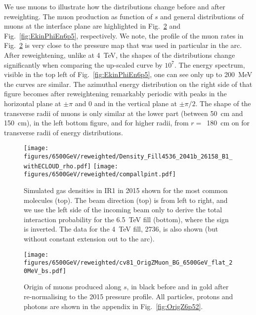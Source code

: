 We use muons to illustrate how the distributions change before and after reweighting. The muon production as function of $s$ and general distributions of muons at the interface plane are highlighted in Fig.~\ref{fig:OrigZ6p5} and Fig.~\ref{fig:EkinPhiEn6p5}, respectively. We note, the profile of the muon rates in Fig.~\ref{fig:OrigZ6p5} is very close to the pressure map that was used in particular in the arc. After reweightening, unlike at 4~TeV, the shapes of the distributions change significantly when comparing the up-scaled curve by $10^7$. The energy spectrum, visible in the top left of Fig.~\ref{fig:EkinPhiEn6p5}, one can see only up to 200~MeV the curves are similar. The azimuthal energy distribution on the right side of that figure becomes after reweightening remarkably periodic with peaks in the horizontal plane at $\pm \pi$ and $0$ and in the vertical plane at $\pm \pi/2$. The shape of the transverse radii of muons is only similar at the lower part (between 50~cm and 150~cm), in the left bottom figure, and for higher radii, from $r =$~180~cm on for transverse radii of energy distributions.

\begin{figure}
\begin{center}
  \texttt{[image: figures/6500GeV/reweighted/Density\_Fill4536\_2041b\_26158\_B1\_withECLOUD\_rho.pdf]}
  \texttt{[image: figures/6500GeV/reweighted/compallpint.pdf]}
\end{center}
\vspace{-0.6cm}
 \caption{Simulated gas densities in IR1 in 2015 shown for the most common molecules (top). The beam direction (top) is from left to right, and we use the left side of the incoming beam only to derive the total interaction probability for the 6.5~TeV fill (bottom), where the sign is inverted. The data for the 4~TeV fill, 2736, is also shown (but without constant extension out to the arc).
  \label{pressure2015}}
\end{figure}

\begin{figure}
\begin{center}
  \texttt{[image: figures/6500GeV/reweighted/cv81\_OrigZMuon\_BG\_6500GeV\_flat\_20MeV\_bs.pdf]}
\end{center}
\vspace{-0.6cm}
 \caption{Origin of muons produced along $s$, in black before and in gold after re-normalising to the 2015 pressure profile. All particles, protons and photons are shown in the appendix in Fig.~\ref{fig:OrigZ6p52}. 
  \label{fig:OrigZ6p5}}
\end{figure}

